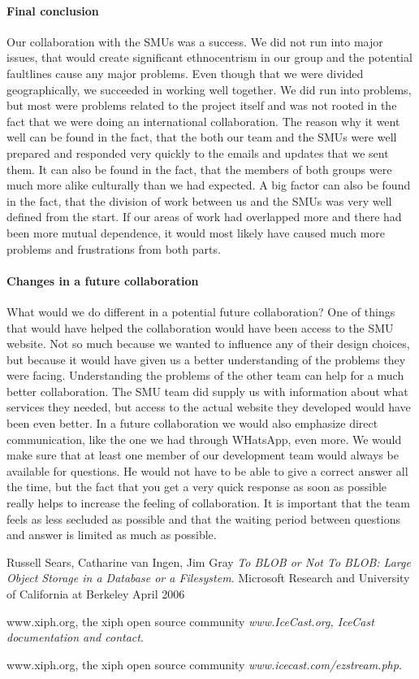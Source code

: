 \documentclass[a4paper,11pt,report]{article}
\begin{document}
\paragraph{Final conclusion}
Our collaboration with the SMUs was a success. We did not run into major issues, that would create significant ethnocentrism in our group and the potential faultlines cause any major problems. Even though that we were divided geographically, we succeeded in working well together. We did run into problems, but most were problems related to the project itself and was not rooted in the fact that we were doing an international collaboration. The reason why it went well can be found in the fact, that the both our team and the SMUs were well prepared and responded very quickly to the emails and updates that we sent them. It can also be found in the fact, that the members of both groups were much more alike culturally than we had expected. A big factor can also be found in the fact, that the division of work between us and the SMUs was very well defined from the start. If our areas of work had overlapped more and there had been more mutual dependence, it would most likely have caused much more problems and frustrations from both parts. 

\paragraph{Changes in a future collaboration}
What would we do different in a potential future collaboration? One of things that would have helped the collaboration would have been access to the SMU website. Not so much because we wanted to influence any of their design choices, but because it would have given us a better understanding of the problems they were facing. Understanding the problems of the other team can help for a much better collaboration. The SMU team did supply us with information about what services they needed, but access to the actual website they developed would have been even better. In a future collaboration we would also emphasize direct communication, like the one we had through WHatsApp, even more. We would make sure that at least one member of our development team would always be available for questions. He would not have to be able to give a correct answer all the time, but the fact that you get a very quick response as soon as possible really helps to increase the feeling of collaboration. It is important that the team feels as less secluded as possible and that the waiting period between questions and answer is limited as much as possible. 

\begin{thebibliography}{9}
  Russell Sears, Catharine van Ingen, Jim Gray
  \emph{To BLOB or Not To BLOB: 
Large Object Storage in a Database or a Filesystem}.
  Microsoft Research and University of California at Berkeley
  April 2006
  
  www.xiph.org, the xiph open source community
  \emph{www.IceCast.org, IceCast documentation and contact}.
    
  www.xiph.org, the xiph open source community
  \emph{www.icecast.com/ezstream.php}.
\end{thebibliography}
\end{document}
